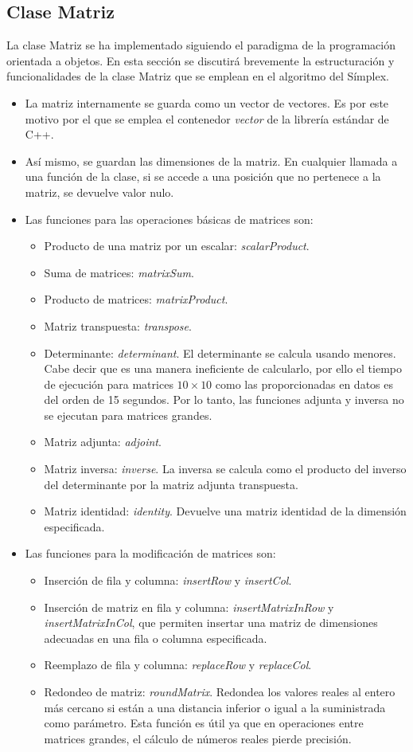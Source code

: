 \documentclass[12pt, titlepage]{article}
\begin{document}
\subsection{Clase Matriz}
La clase Matriz se ha implementado siguiendo el paradigma de la programación orientada a objetos. En esta sección se discutirá brevemente la estructuración y funcionalidades de la clase Matriz que se emplean en el algoritmo del Símplex.
\begin{itemize}
\item	La matriz internamente se guarda como un vector de vectores. Es por este motivo por el que se emplea el contenedor \textit{vector} de la librería estándar de C++. 
\item	Así mismo, se guardan las dimensiones de la matriz. En cualquier llamada a una función de la clase, si se accede a una posición que no pertenece a la matriz, se devuelve valor nulo.
\item	Las funciones para las operaciones básicas de matrices son:
\begin{itemize}
\item	Producto de una matriz por un escalar: \textit{scalarProduct}.
\item	Suma de matrices: \textit{matrixSum}.
\item	Producto de matrices: \textit{matrixProduct}.
\item	Matriz transpuesta: \textit{transpose}.
\item	Determinante: \textit{determinant}. El determinante se calcula usando menores. Cabe decir que es una manera ineficiente de calcularlo, por ello el tiempo de ejecución para matrices $10\times10$ como las proporcionadas en datos es del orden de 15 segundos. Por lo tanto, las funciones adjunta y inversa no se ejecutan para matrices grandes.
\item	Matriz adjunta:	\textit{adjoint}.
\item	Matriz inversa:	\textit{inverse}. La inversa se calcula como el producto del inverso del determinante por la matriz adjunta transpuesta.
\item	Matriz identidad: \textit{identity}. Devuelve una matriz identidad de la dimensión especificada.
\end{itemize}
\item	Las funciones para la modificación de matrices son:
\begin{itemize}
\item	Inserción de fila y columna: \textit{insertRow} y \textit{insertCol}.
\item	Inserción de matriz en fila y columna: \textit{insertMatrixInRow} y \textit{insertMatrixInCol}, que permiten insertar una matriz de dimensiones adecuadas en una fila o columna especificada.
\item	Reemplazo de fila y columna: \textit{replaceRow} y \textit{replaceCol}.
\item	Redondeo de matriz: \textit{roundMatrix}. Redondea los valores reales al entero más cercano si están a una distancia inferior o igual a la suministrada como parámetro. Esta función es útil ya que en operaciones entre matrices grandes, el cálculo de números reales pierde precisión.
\end{itemize}
\end{itemize}
\end{document}
